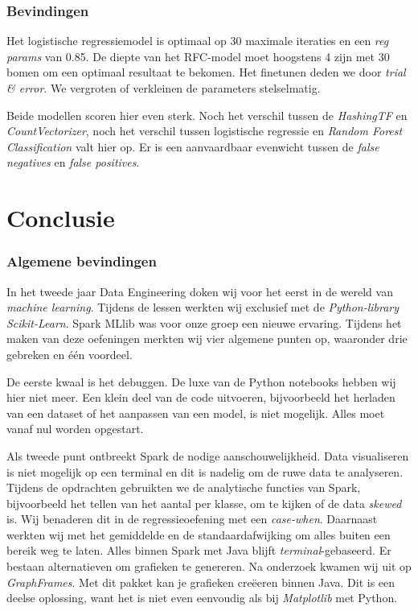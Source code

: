 \documentclass[a4paper,10pt,twoside]{report}
\begin{document}
\subsection*{Bevindingen}

Het logistische regressiemodel is optimaal op 30 maximale iteraties en een \textit{reg params} van 0.85. De diepte van het RFC-model moet hoogstens 4 zijn met 30 bomen om een optimaal resultaat te bekomen. Het finetunen deden we door \textit{trial \& error}. We vergroten of verkleinen de parameters stelselmatig.

Beide modellen scoren hier even sterk. Noch het verschil tussen de \textit{HashingTF} en \textit{CountVectorizer}, noch het verschil tussen logistische regressie en \textit{Random Forest Classification} valt hier op. Er is een aanvaardbaar evenwicht tussen de \textit{false negatives} en \textit{false positives}.

\chapter{Conclusie}

\subsection*{Algemene bevindingen}

In het tweede jaar Data Engineering doken wij voor het eerst in de wereld van \textit{machine learning}. Tijdens de lessen werkten wij exclusief met de \textit{Python-library Scikit-Learn}. Spark MLlib was voor onze groep een nieuwe ervaring. Tijdens het maken van deze oefeningen merkten wij vier algemene punten op, waaronder drie gebreken en één voordeel.

De eerste kwaal is het debuggen. De luxe van de Python notebooks hebben wij hier niet meer. Een klein deel van de code uitvoeren, bijvoorbeeld het herladen van een dataset of het aanpassen van een model, is niet mogelijk. Alles moet vanaf nul worden opgestart. 

Als tweede punt ontbreekt Spark de nodige aanschouwelijkheid. Data visualiseren is niet mogelijk op een terminal en dit is nadelig om de ruwe data te analyseren. Tijdens de opdrachten gebruikten we de analytische functies van Spark, bijvoorbeeld het tellen van het aantal per klasse, om te kijken of de data \textit{skewed} is. Wij benaderen dit in de regressieoefening met een \textit{case-when}.  Daarnaast werkten wij met het gemiddelde en de standaardafwijking om alles buiten een bereik weg te laten. Alles binnen Spark met Java blijft \textit{terminal}-gebaseerd. Er bestaan alternatieven om grafieken te genereren. Na onderzoek kwamen wij uit op \textit{GraphFrames}. Met dit pakket kan je grafieken creëeren binnen Java. Dit is een deelse oplossing, want het is niet even eenvoudig als bij \textit{Matplotlib} met Python.
\end{document}
